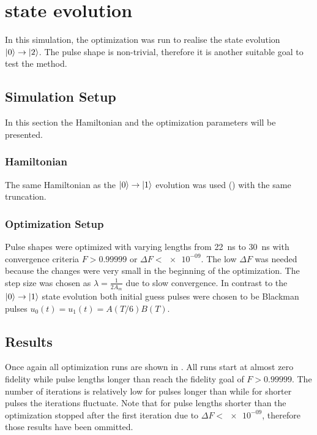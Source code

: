 \documentclass[main.tex]{subfiles}
\begin{document}
\chapter{%
\texorpdfstring{}{0 -> 2} state evolution
}
In this simulation, the optimization was run to realise the state evolution \(\ket{0}\rightarrow\ket{2}\).
The pulse shape is non-trivial, therefore it is another suitable goal to test the method.

\section{Simulation Setup}
In this section the Hamiltonian and the optimization parameters will be presented.

\subsection{Hamiltonian}
The same Hamiltonian as the \(\ket{0}\rightarrow\ket{1}\) evolution was used () with the same truncation.

\subsection{Optimization Setup}
Pulse shapes were optimized with varying lengths from \SI{22}{\nano\second} to \SI{30}{\nano\second} with convergence criteria \(F>0.99999\) or \(\Delta F < \num{e-09}\).
The low \(\Delta F\) was needed because the changes were very small in the beginning of the optimization.
The step size was chosen as \(\lambda = \frac{1}{2A_{m}}\) due to slow convergence.
In contrast to the \(\ket{0}\rightarrow\ket{1}\) state evolution both initial guess pulses were chosen to be Blackman pulses \(u_0(t) = u_1(t) = A(T/6)B(T)\).

\section{Results}
Once again all optimization runs are shown in .
All runs start at almost zero fidelity while pulse lengths longer than  reach the fidelity goal of \(F > 0.99999\).
The number of iterations is relatively low for pulses longer than  while for shorter pulses the iterations fluctuate.
Note that for pulse lengths shorter than  the optimization stopped after the first iteration due to \(\Delta F < \num{e-09}\), therefore those results have been ommitted.
\end{document}
